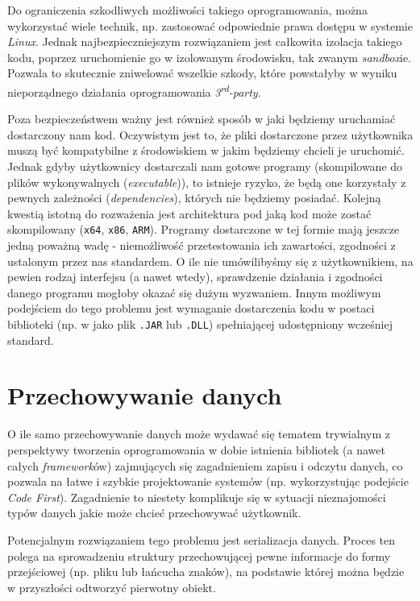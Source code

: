 \par Do ograniczenia szkodliwych możliwości takiego oprogramowania, można wykorzystać wiele technik, np. zastosować odpowiednie prawa dostępu w systemie \emph{Linux}. Jednak najbezpieczniejszym rozwiązaniem jest całkowita izolacja takiego kodu, poprzez uruchomienie go w izolowanym środowisku, tak zwanym \emph{sandbox}ie. Pozwala to skutecznie zniwelować wszelkie szkody, które powstałyby w wyniku nieporządnego działania oprogramowania \emph{3\textsuperscript{rd}-party}.

\par Poza bezpieczeństwem ważny jest również sposób w jaki będziemy uruchamiać dostarczony nam kod. Oczywistym jest to, że pliki dostarczone przez użytkownika muszą być kompatybilne z środowiskiem w jakim będziemy chcieli je uruchomić. Jednak gdyby użytkownicy dostarczali nam gotowe programy (skompilowane do plików wykonywalnych (\emph{executable})), to istnieje ryzyko, że będą one korzystały z pewnych zależności (\emph{dependencies}), których nie będziemy posiadać. Kolejną kwestią istotną do rozważenia jest architektura pod jaką kod może zostać skompilowany (\texttt{x64}, \texttt{x86}, \texttt{ARM}). Programy dostarczone w tej formie mają jeszcze jedną poważną wadę - niemożliwość przetestowania ich zawartości, zgodności z ustalonym przez nas standardem. O ile nie umówilibyśmy się z użytkownikiem, na pewien rodzaj interfejsu (a nawet wtedy), sprawdzenie działania i zgodności danego programu mogłoby okazać się dużym wyzwaniem. Innym możliwym podejściem do tego problemu jest wymaganie dostarczenia kodu w postaci biblioteki (np. w jako plik \texttt{.JAR} lub \texttt{.DLL}) spełniającej udostępniony wcześniej standard.

\section{Przechowywanie danych}

\par O ile samo przechowywanie danych może wydawać się tematem trywialnym z perspektywy tworzenia oprogramowania w dobie istnienia bibliotek (a nawet całych \emph{framework}ów) zajmujących się zagadnieniem zapisu i odczytu danych, co pozwala na łatwe i szybkie projektowanie systemów (np. wykorzystując podejście \emph{Code First}). Zagadnienie to niestety komplikuje się w sytuacji nieznajomości typów danych jakie może chcieć przechowywać użytkownik.

\par Potencjalnym rozwiązaniem tego problemu jest serializacja danych. Proces ten polega na sprowadzeniu struktury przechowującej pewne informacje do formy przejściowej (np. pliku lub łańcucha znaków), na podstawie której można będzie w przyszłości odtworzyć pierwotny obiekt.

